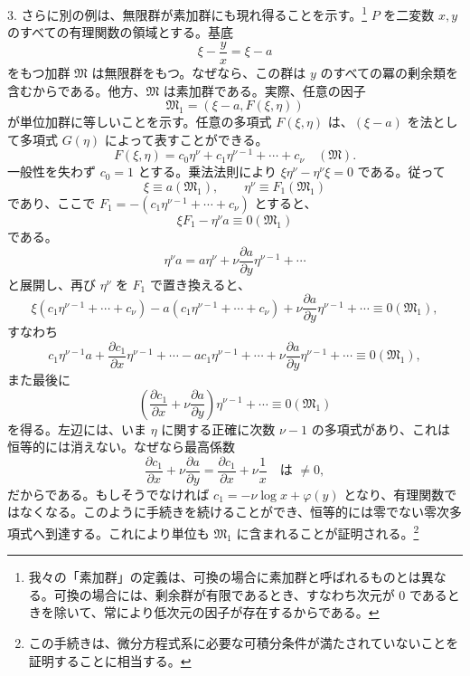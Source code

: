 \documentclass[11pt]{article}
\begin{document}
3. さらに別の例は、無限群が素加群にも現れ得ることを示す。\footnote{我々の「素加群」の定義は、可換の場合に素加群と呼ばれるものとは異なる。可換の場合には、剰余群が有限であるとき、すなわち次元が $0$ であるときを除いて、常により低次元の因子が存在するからである。} $P$ を二変数 $x,y$ のすべての有理関数の領域とする。基底
\[
 \xi-\frac{y}{x}=\xi-a
\]
をもつ加群 $\mathfrak M$ は無限群をもつ。なぜなら、この群は $y$ のすべての冪の剰余類を含むからである。他方、$\mathfrak M$ は素加群である。実際、任意の因子
\[
 \mathfrak M_1=(\xi-a,
F(\xi,\eta))
\]
が単位加群に等しいことを示す。任意の多項式 $F(\xi,\eta)$ は、$(\xi-a)$ を法として多項式 $G(\eta)$ によって表すことができる。
\[
 F(\xi,
\eta)=c_0\eta^\nu+c_1\eta^{\nu-1}+\cdots+c_\nu\quad(\mathfrak M).
\]
一般性を失わず $c_0=1$ とする。乗法法則により $\xi\eta^\nu-\eta^\nu\xi=0$ である。従って
\[
 \xi\equiv a(\mathfrak M_1),
 \qquad
 \eta^\nu\equiv F_1(\mathfrak M_1)
\]
であり、ここで $F_1=-(c_1\eta^{\nu-1}+\cdots+c_\nu)$ とすると、
\[
 \xi F_1-\eta^\nu a\equiv0(\mathfrak M_1)
\]
である。
\[
 \eta^\nu a=a\eta^\nu+\nu\frac{\partial a}{\partial y}\eta^{\nu-1}+\cdots
\]
と展開し、再び $\eta^\nu$ を $F_1$ で置き換えると、
\[
 \xi(c_1\eta^{\nu-1}+\cdots+c_\nu)-a(c_1\eta^{\nu-1}+\cdots+c_\nu)
 +\nu\frac{\partial a}{\partial y}\eta^{\nu-1}+\cdots\equiv0(\mathfrak M_1),
\]
すなわち
\[
 c_1\eta^{\nu-1}a+\frac{\partial c_1}{\partial x}\eta^{\nu-1}+\cdots
 -ac_1\eta^{\nu-1}+\cdots+
\nu\frac{\partial a}{\partial y}\eta^{\nu-1}+\cdots
 \equiv0(\mathfrak M_1),
\]
また最後に
\[
 \left(\frac{\partial c_1}{\partial x}+\nu\frac{\partial a}{\partial y}\right)\eta^{\nu-1}+\cdots
 \equiv0(\mathfrak M_1)
\]
を得る。左辺には、いま $\eta$ に関する正確に次数 $\nu-1$ の多項式があり、これは恒等的には消えない。なぜなら最高係数
\[
 \frac{\partial c_1}{\partial x}+\nu\frac{\partial a}{\partial y}
 =\frac{\partial c_1}{\partial x}+\nu\frac{1}{x}
 \quad\text{は }\ne0,
\]
だからである。もしそうでなければ $c_1=-\nu\log x+\varphi(y)$ となり、有理関数ではなくなる。このように手続きを続けることができ、恒等的には零でない零次多項式へ到達する。これにより単位も $\mathfrak M_1$ に含まれることが証明される。\footnote{この手続きは、微分方程式系に必要な可積分条件が満たされていないことを証明することに相当する。}
\end{document}
